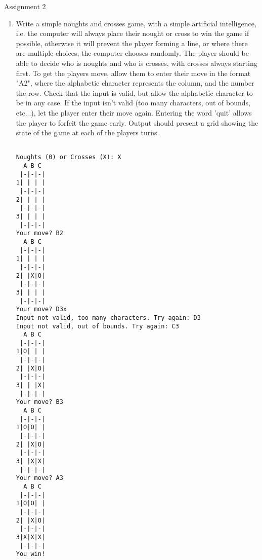 \hypertarget{assignment2}{Assignment 2}
\begin{enumerate}
	\item Write a simple noughts and crosses    game, with a simple artificial intelligence, i.e. the computer    will always place their nought or cross to win the game if    possible, otherwise it will prevent the player forming a line,    or where there are multiple choices, the computer chooses    randomly.  The player should be able to decide who is noughts    and who is crosses, with crosses always starting first.  To get    the players move, allow them to enter their move in the format    "A2", where the alphabetic character represents the column, and    the number the row. Check that the input is valid, but allow    the alphabetic character to be in any case. If the input isn't    valid (too many characters, out of bounds, etc...), let the    player enter their move again. Entering the word 'quit' allows    the player to forfeit the game early. Output should present a    grid showing the state of the game at each of the players    turns.     
\begin{lstlisting}

Noughts (0) or Crosses (X): X
  A B C
 |-|-|-|
1| | | |
 |-|-|-|
2| | | |
 |-|-|-|
3| | | |
 |-|-|-|
Your move? B2
  A B C
 |-|-|-|
1| | | |
 |-|-|-|
2| |X|O|
 |-|-|-|
3| | | |
 |-|-|-|
Your move? D3x
Input not valid, too many characters. Try again: D3
Input not valid, out of bounds. Try again: C3
  A B C
 |-|-|-|
1|O| | |
 |-|-|-|
2| |X|O|
 |-|-|-|
3| | |X|
 |-|-|-|
Your move? B3
  A B C
 |-|-|-|
1|O|O| |
 |-|-|-|
2| |X|O|
 |-|-|-|
3| |X|X|
 |-|-|-|
Your move? A3
  A B C
 |-|-|-|
1|O|O| |
 |-|-|-|
2| |X|O|
 |-|-|-|
3|X|X|X|
 |-|-|-|
You win!
\end{lstlisting}
\end{enumerate}

